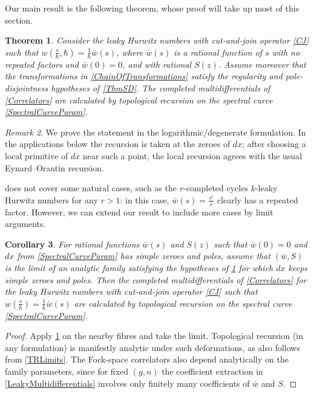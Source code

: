 \documentclass[10pt,a4paper,oneside,no-math,reqno]{amsart}%
\theoremstyle{plain}
\newtheorem{theorem}{Theorem}[section]
\newtheorem{corollary}[theorem]{Corollary}
\theoremstyle{definition}
\theoremstyle{remark}
\newtheorem{remark}[theorem]{Remark}
\numberwithin{equation}{section}
\newcommand{\1}{\mathds{1}}
\newcommand{\<}{\langle}
\renewcommand{\>}{\rangle}
\begin{document}
Our main result is the following theorem, whose proof will take up most of this section.

\begin{theorem}\label{LeakyTRThm}
	Consider the leaky Hurwitz numbers with cut-and-join operator \eqref{CJ} such that $ w(\frac{s}{\hbar},\hbar) = \frac{1}{\hbar} \bar{w}(s) $, where $ \bar{w}(s)$ is a rational function of $s$ with no repeated factors and $\bar{w}(0)=0$, and with rational $S(z)$. Assume moreover that the transformations in \eqref{ChainOfTransformations} satisfy the regularity and pole-disjointness hypotheses of \cref{ThmSD}. The completed multidifferentials of \cref{Correlators} are calculated by topological recursion on the spectral curve \eqref{SpectralCurveParam}.
\end{theorem}

\begin{remark}
    We prove the statement in the logarithmic/degenerate formulation. In the applications below the recursion is taken at the zeroes of $dx$; after choosing a local primitive of $dx$ near such a point, the local recursion agrees with the usual Eynard--Orantin recursion.
\end{remark}

 does not cover some natural cases, such as the $ r$-completed cycles $ k$-leaky Hurwitz numbers for any $ r>1$: in this case, $ \bar{w} (s) = \frac{s^r}{r}$ clearly has a repeated factor. However, we can extend our result to include more cases by limit arguments.

\begin{corollary}\label{LeakyTRLimit}
    For rational functions $ \bar{w}(s)$ and $S(z)$ such that $\bar{w}(0)=0$ and $ d x$ from \eqref{SpectralCurveParam} has simple zeroes and poles, assume that $(\bar{w},S)$ is the limit of an analytic family satisfying the hypotheses of \cref{LeakyTRThm} for which $dx$ keeps simple zeroes and poles. Then the completed multidifferentials of \cref{Correlators} for the leaky Hurwitz numbers with cut-and-join operator \eqref{CJ} such that $ w(\frac{s}{\hbar}) = \frac{1}{\hbar} \bar{w}(s) $ are calculated by topological recursion on the spectral curve \eqref{SpectralCurveParam}.
\end{corollary}

\begin{proof}
    Apply \cref{LeakyTRThm} on the nearby fibres and take the limit. Topological recursion (in any formulation) is manifestly analytic under such deformations, as also follows from \cref{TRLimits}. The Fock-space correlators also depend analytically on the family parameters, since for fixed $(g,n)$ the coefficient extraction in \cref{LeakyMultidifferentials} involves only finitely many coefficients of $\bar w$ and $S$.
\end{proof}
\end{document}
